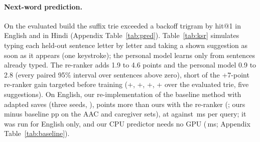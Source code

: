 \paragraph{Next-word prediction.}
On the evaluated build the suffix trie exceeded a backoff trigram by \PredDENOneTri{} hit@1 in English and \PredDHIOneTri{} in Hindi (Appendix Table~\ref{tab:pred}).
Table~\ref{tab:ksr} simulates typing each held-out sentence letter by letter and taking a shown suggestion as soon as it appears (one keystroke); the personal model learns only from sentences already typed.
The re-ranker adds 1.9 to 4.6 points and the personal model 0.9 to 2.8 (every paired 95\% interval over sentences above zero), short of the +7-point re-ranker gain targeted before training (+\LoraGainEN{}, +\LoraGainHI{}, +\LoraGainMR{}, +\LoraGainGU{} over the evaluated trie, five suggestions).
On English, our re-implementation of the baseline method \citep{gaines2025adapting} with adapted  \citep{zhang2022opt} saves \OptAdKSR{} (three seeds, \OptAdRange{}), \OptAdMinusOurs{} points more than ours with the re-ranker (\OursGpuKSR{}; ours minus baseline \OursGpuVsAdCI{} pp on the AAC and caregiver sets), at \OptAdMs{} against \OursGpuMs{}\,ms per query; it was run for English only, and our CPU predictor needs no GPU (\OursCpuMs{}\,ms; Appendix Table~\ref{tab:baseline}).
